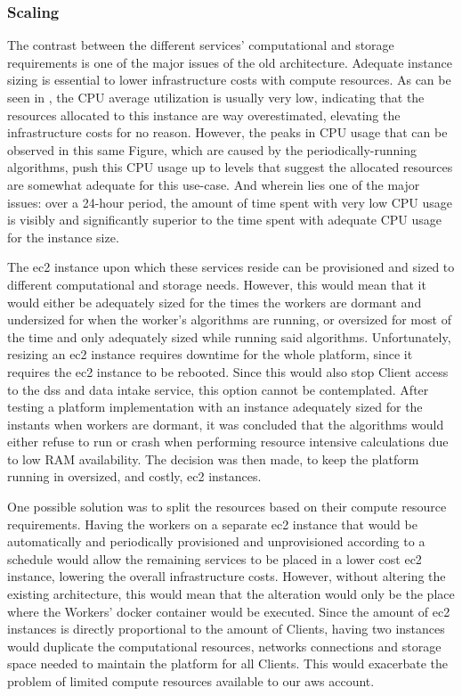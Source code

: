 \subsubsection{Scaling}\label{methodology:sss:scaling}

The contrast between the different services' computational and storage requirements is one of the major issues of the old architecture. Adequate instance sizing is essential to lower infrastructure costs with compute resources. As can be seen in , the CPU average utilization is usually very low, indicating that the resources allocated to this instance are way overestimated, elevating the infrastructure costs for no reason. However, the peaks in CPU usage that can be observed in this same Figure, which are caused by the periodically-running algorithms, push this CPU usage up to levels that suggest the allocated resources are somewhat adequate for this use-case. And wherein lies one of the major issues: over a 24-hour period, the amount of time spent with very low CPU usage is visibly and significantly superior to the time spent with adequate CPU usage for the instance size. 



The \gls{ec2} instance upon which these services reside can be provisioned and sized to different computational and storage needs. However, this would mean that it would either be adequately sized for the times the workers are dormant and undersized for when the worker's algorithms are running, or oversized for most of the time and only adequately sized while running said algorithms. Unfortunately, resizing an \gls{ec2} instance requires downtime for the whole platform, since it requires the \gls{ec2} instance to be rebooted. Since this would also stop Client access to the \gls{dss} and data intake service, this option cannot be contemplated. After testing a platform implementation with an instance adequately sized for the instants when workers are dormant, it was concluded that the algorithms would either refuse to run or crash when performing resource intensive calculations due to low RAM availability. The decision was then made, to keep the platform running in oversized, and costly, \gls{ec2} instances.

 One possible solution was to split the resources based on their compute resource requirements. Having the workers on a separate \gls{ec2} instance that would be automatically and periodically provisioned and unprovisioned according to a schedule would allow the remaining services to be placed in a lower cost \gls{ec2} instance, lowering the overall infrastructure costs. However, without altering the existing architecture, this would mean that the alteration would only be the place where the Workers' docker container would be executed. Since the amount of \gls{ec2} instances is directly proportional to the amount of Clients, having two instances would duplicate the computational resources, networks connections and storage space needed to maintain the platform for all Clients. This would exacerbate the problem of limited compute resources available to our \gls{aws} account.

